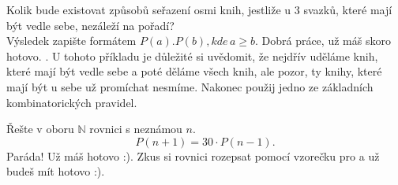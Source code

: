 \documentclass[language = czech]{webquiz}
\begin{document}
	 \begin{question} \label{o7} %
	 	Kolik bude existovat způsobů seřazení osmi knih, jestliže u 3 svazků, které mají být vedle sebe, nezáleží na pořadí?\\Výsledek zapište formátem $P(a).P(b), kde \, a \geq b$.
	 	\whenRight Dobrá práce, už máš skoro hotovo. .
	 	\whenWrong U tohoto příkladu je důležité si uvědomit, že nejdřív uděláme  knih, které mají být vedle sebe a poté děláme  všech knih, ale pozor, ty knihy, které mají být u sebe už promíchat nesmíme. Nakonec použij jedno ze základních kombinatorických pravidel. 
	 \end{question}
	
	 \begin{question} \label{o8} %
	 	Řešte v oboru $\mathbb{N}$ rovnici s neznámou $n$. \[P(n+1)=30\cdot P(n-1).\]
	 	\whenRight Paráda! Už máš hotovo :).
	 	\whenWrong Zkus si rovnici rozepsat pomocí vzorečku pro  a už budeš mít hotovo :).
	 \end{question}
\end{document}
